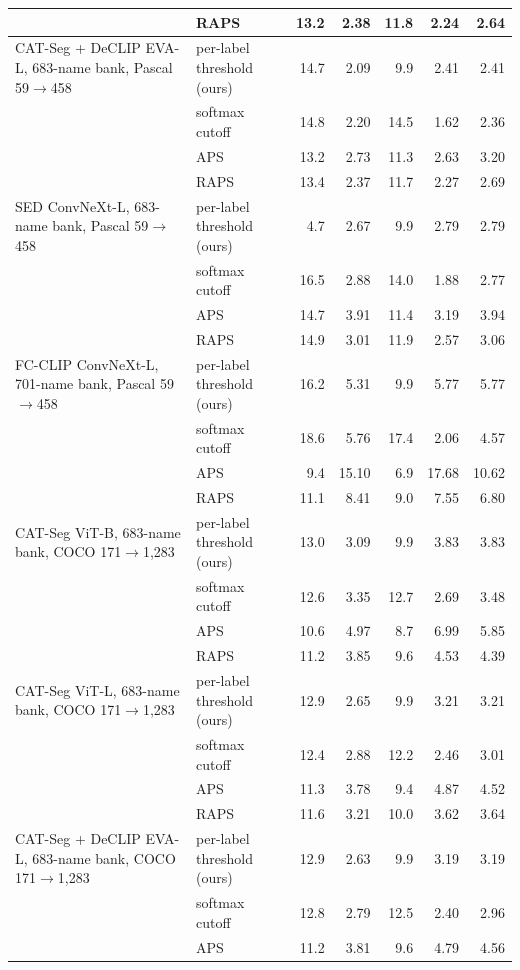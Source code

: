 \begin{tabular}{@{}llrrrrr@{}}
 & RAPS & 13.2 & 2.38 & 11.8 & 2.24 & 2.64 \\
\midrule
CAT-Seg + DeCLIP EVA-L, 683-name bank, Pascal 59$\to$458 & per-label threshold (ours) & 14.7 & 2.09 & 9.9 & 2.41 & 2.41 \\
 & softmax cutoff & 14.8 & 2.20 & 14.5 & 1.62 & 2.36 \\
 & APS & 13.2 & 2.73 & 11.3 & 2.63 & 3.20 \\
 & RAPS & 13.4 & 2.37 & 11.7 & 2.27 & 2.69 \\
\midrule
SED ConvNeXt-L, 683-name bank, Pascal 59$\to$458 & per-label threshold (ours) & 4.7 & 2.67 & 9.9 & 2.79 & 2.79 \\
 & softmax cutoff & 16.5 & 2.88 & 14.0 & 1.88 & 2.77 \\
 & APS & 14.7 & 3.91 & 11.4 & 3.19 & 3.94 \\
 & RAPS & 14.9 & 3.01 & 11.9 & 2.57 & 3.06 \\
\midrule
FC-CLIP ConvNeXt-L, 701-name bank, Pascal 59$\to$458 & per-label threshold (ours) & 16.2 & 5.31 & 9.9 & 5.77 & 5.77 \\
 & softmax cutoff & 18.6 & 5.76 & 17.4 & 2.06 & 4.57 \\
 & APS & 9.4 & 15.10 & 6.9 & 17.68 & 10.62 \\
 & RAPS & 11.1 & 8.41 & 9.0 & 7.55 & 6.80 \\
\midrule
CAT-Seg ViT-B, 683-name bank, COCO 171$\to$1,283 & per-label threshold (ours) & 13.0 & 3.09 & 9.9 & 3.83 & 3.83 \\
 & softmax cutoff & 12.6 & 3.35 & 12.7 & 2.69 & 3.48 \\
 & APS & 10.6 & 4.97 & 8.7 & 6.99 & 5.85 \\
 & RAPS & 11.2 & 3.85 & 9.6 & 4.53 & 4.39 \\
\midrule
CAT-Seg ViT-L, 683-name bank, COCO 171$\to$1,283 & per-label threshold (ours) & 12.9 & 2.65 & 9.9 & 3.21 & 3.21 \\
 & softmax cutoff & 12.4 & 2.88 & 12.2 & 2.46 & 3.01 \\
 & APS & 11.3 & 3.78 & 9.4 & 4.87 & 4.52 \\
 & RAPS & 11.6 & 3.21 & 10.0 & 3.62 & 3.64 \\
\midrule
CAT-Seg + DeCLIP EVA-L, 683-name bank, COCO 171$\to$1,283 & per-label threshold (ours) & 12.9 & 2.63 & 9.9 & 3.19 & 3.19 \\
 & softmax cutoff & 12.8 & 2.79 & 12.5 & 2.40 & 2.96 \\
 & APS & 11.2 & 3.81 & 9.6 & 4.79 & 4.56 \\

\end{tabular}
